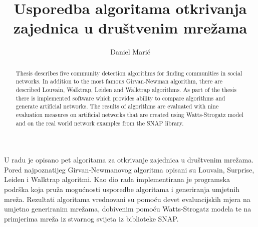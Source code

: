\documentclass[times, utf8, diplomski]{fer}
\begin{document}

\title{Usporedba algoritama otkrivanja zajednica u društvenim mrežama}

\author{Daniel Marić}

\maketitle

\izvornik


\tableofcontents




















\begin{sazetak}
U radu je opisano pet algoritama za otkrivanje zajednica u društvenim mrežama. Pored najpoznatijeg Girvan-Newmanovog algoritma opisani su Louvain, Surprise, Leiden i Walktrap algoritmi. Kao dio rada implementirana je programska podrška koja pruža mogućnosti usporedbe algoritama i generiranja umjetnih mreža. Rezultati algoritama vrednovani su pomoću devet evaluacijskih mjera na umjetno generiranim mrežama, dobivenim pomoću Watts-Strogatz modela te na primjerima mreža iz stvarnog svijeta iz biblioteke SNAP. 

\end{sazetak}

\begin{abstract}
Thesis describes five community detection algorithms for finding communities in social networks. In addition to the most famous Girvan-Newman algorithm, there are described Louvain, Walktrap, Leiden and Walktrap algorithms. As part of the thesis there is implemented software which provides ability to compare algorithms and generate artificial networks. The results of algorithms are evaluated with nine evaluation measures on artificial networks that are created using Watts-Strogatz model and on the real world network examples from the SNAP library.

\end{abstract}
\end{document}

